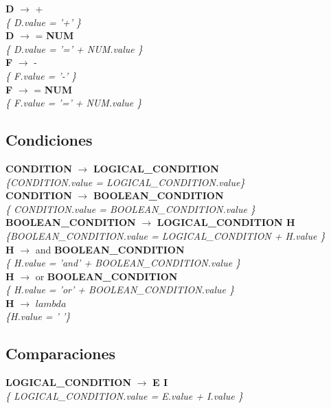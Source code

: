 \documentclass[10pt,a4paper]{article}
\begin{document}
\textbf{D} $\rightarrow$ +   \\
\textit{\{ D.value = '+'  \}} \\

\textbf{D} $\rightarrow$ = \textbf{NUM} \\
\textit{\{ D.value =  '=' + NUM.value  \}} \\

\textbf{F} $\rightarrow$ - \\
\textit{\{ F.value = '-'  \}} \\

\textbf{F} $\rightarrow$ = \textbf{NUM} \\
\textit{\{ F.value =  '=' + NUM.value  \}} \\

\subsection{Condiciones}
\textbf{CONDITION} $\rightarrow$ \textbf{LOGICAL\_CONDITION}   \\
\textit{\{CONDITION.value = LOGICAL\_CONDITION.value\}}\\

\textbf{CONDITION} $\rightarrow$ \textbf{BOOLEAN\_CONDITION} \\
\textit{\{ CONDITION.value = BOOLEAN\_CONDITION.value  \}} \\

\textbf{BOOLEAN\_CONDITION} $\rightarrow$ \textbf{LOGICAL\_CONDITION H} \\
\textit{\{BOOLEAN\_CONDITION.value = LOGICAL\_CONDITION + H.value   \}} \\

\textbf{H} $\rightarrow$ and \textbf{BOOLEAN\_CONDITION} \\
\textit{\{ H.value = 'and' + BOOLEAN\_CONDITION.value   \}} \\

\textbf{H} $\rightarrow$ or \textbf{BOOLEAN\_CONDITION} \\
\textit{\{ H.value = 'or' + BOOLEAN\_CONDITION.value   \}} \\

\textbf{H} $\rightarrow$ $lambda$ \\
\textit{\{H.value = ' '\}} \\

\subsection{Comparaciones}
\textbf{LOGICAL\_CONDITION} $\rightarrow$ \textbf{E I} \\
\textit{\{ LOGICAL\_CONDITION.value = E.value + I.value   \}} \\
\end{document}
